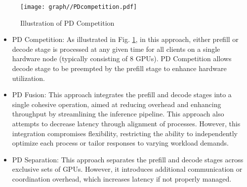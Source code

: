 

\begin{figure}
    \centering
    \texttt{[image: graph//PDcompetition.pdf]}
    \caption{Illustration of PD Competition}
    \label{fig:PDcompetition}
\end{figure}

\begin{itemize}
    \item PD Competition: As illustrated in Fig. \ref{fig:PDcompetition}, in this approach, either prefill or decode stage is processed at any given time for all clients on a single hardware node (typically consisting of 8 GPUs). PD Competition allows decode stage to be preempted by the prefill stage to enhance hardware utilization.
    \item PD Fusion: This approach integrates the prefill and decode stages into a single cohesive operation, aimed at reducing overhead and enhancing throughput by streamlining the inference pipeline. This approach also attempts to decrease latency through alignment of processes. However, this integration compromises flexibility, restricting the ability to independently optimize each process or tailor responses to varying workload demands.
    \item PD Separation: This approach separates the prefill and decode stages across exclusive sets of GPUs. However, it introduces additional communication or coordination overhead, which increases latency if not properly managed.

\end{itemize}

